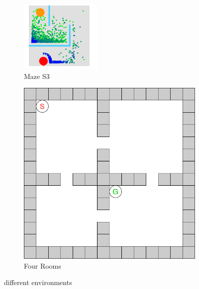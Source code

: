 \documentclass[bibliography=totoc]{scrartcl}
\begin{document}
\begin{figure}[H]
	\centering
	\begin{subfigure}[b]{0.3\linewidth}
		\includegraphics[width=\linewidth]{img/Maze_s3.png}
        \caption{Maze S3}	
    \end{subfigure}
	\hspace{0.02\textwidth}
	\begin{subfigure}[b]{0.3\linewidth}
		\includegraphics[width=\linewidth]{img/Four_Rooms.png}
		\caption{Four Rooms}
	\end{subfigure}
 	\caption{different environments}
	\label{fig:differentenvironments}
\end{figure}
\end{document}
